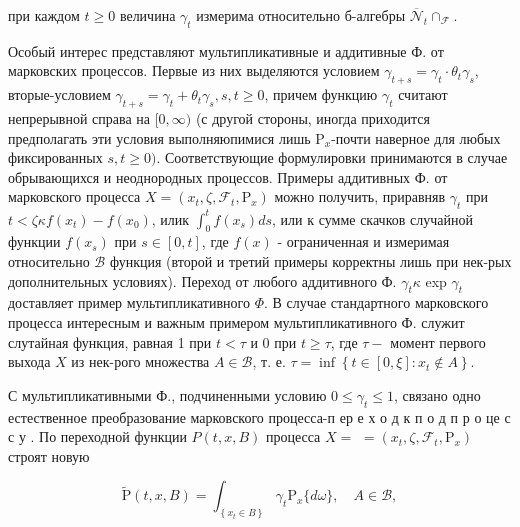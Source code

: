 \documentclass[10pt]{article}
\begin{document}
при каждом $t \geqslant 0$ величина $\gamma_{t}$ измерима относительно б-алгебры $\overline{\mathcal{N}}_{t} \cap_{\mathscr{F}}$.



Особый интерес представляют мультипликативные и аддитивные Ф. от марковских процессов. Первые из них выделяются условием $\gamma_{t+s}=\gamma_{t} \cdot \theta_{t} \gamma_{s}$, вторые-условием $\gamma_{t+s}=\gamma_{t}+\theta_{t} \gamma_{s}, s, t \geqslant 0$, причем функцию $\gamma_{t}$ считают непрерывной справа на $[0, \infty)$ (с другой стороны, иногда приходится предполагать эти условия выполняюпимися лишь $\mathrm{P}_{x}$-почти наверное для любых фиксированных $s, t \geqslant 0)$. Соответствующие формулировки принимаются в случае обрывающихся и неоднородных процессов. Примеры аддитивных Ф. от марковского процесса $X=\left(x_{t}, \zeta, \mathscr{F}_{t}, \mathrm{P}_{x}\right)$ можно получить, приравняв $\gamma_{t}$ при $t<\zeta \kappa f\left(x_{t}\right)-f\left(x_{0}\right)$, илик $\int_{0}^{t} f\left(x_{s}\right) d s$, или к сумме скачков случайной функции $f\left(x_{s}\right)$ при $s \in[0, t]$, где $f(x)$ - ограниченная и измеримая относительно $\mathscr{B}$ функция (второй и третий примеры корректны лишь при нек-рых дополнительных условиях). Переход от любого аддитивного Ф. $\gamma_{t} \kappa$ exp $\gamma_{t}$ доставляет пример мультипликативного $\Phi$. В случае стандартного марковского процесса интересным и важным примером мультипликативного Ф. служит слутайная функция, равная 1 при $t<\tau$ и 0 при $t \geqslant \tau$, где $\tau-$ момент первого выхода $X$ из нек-рого множества $A \in \mathscr{B}$, т. е. $\tau=\inf \left\{t \in[0, \xi]: x_{t} \notin A\right\}$.



С мультипликативными Ф., подчиненными условию $0 \leqslant \gamma_{t} \leqslant 1$, связано одно естественное преобразование марковского процесса-п ер е х о д к п о д п р о це с с у . По переходной функции $P(t, x, B)$ процесса $X=$ $=\left(x_{t}, \zeta, \mathscr{F}_{t}, \mathrm{P}_{x}\right)$ строят новую



\[

\tilde{\mathrm{P}}(t, x, B)=\int_{\left\{x_{t} \in B\right\}} \gamma_{t} \mathrm{P}_{x}\{d \omega\}, \quad A \in \mathscr{B},

\]
\end{document}
